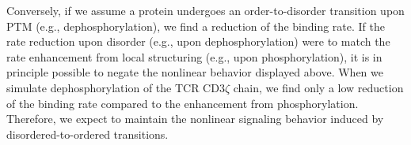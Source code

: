 \documentclass[../../AdvancementSummary.tex]{subfiles}
\begin{document}
%




Conversely, if we assume a protein undergoes an order-to-disorder transition upon PTM (e.g., dephosphorylation), we find a reduction of the binding rate.
	If the rate reduction upon disorder (e.g., upon dephosphorylation) were to match the rate enhancement from local structuring (e.g., upon phosphorylation), it is in principle possible to negate the nonlinear behavior displayed above.
	When we simulate dephosphorylation of the TCR CD3$\zeta$ chain, we find only a low reduction of the binding rate compared to the enhancement from phosphorylation.
	Therefore, we expect to maintain the nonlinear signaling behavior induced by disordered-to-ordered transitions.
	

%

%
\end{document}

